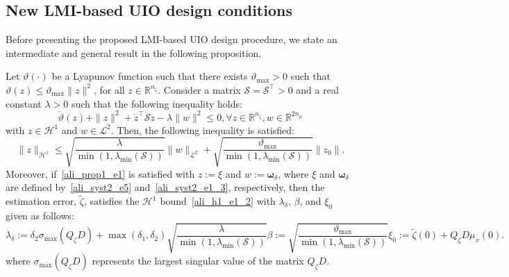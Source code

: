 \subsection{New LMI-based UIO design conditions}
Before presenting the proposed LMI-based UIO design procedure, we state an intermediate and general result in the following proposition.
\begin{proposition}\label{ali_prop1}
Let $\vartheta(\cdot)$ be a Lyapunov function such that there exists $\vartheta_{\max} >0$ such that $\vartheta(z) \leq \vartheta_{\max}\| z \|^{2}$, for all $z \in \mathbb{R}^{n_\zeta}$. Consider a matrix $\mathcal{S} = \mathcal{S}^{\top} > 0$ and a real constant $\lambda >0$ such that the following inequality holds:
\begin{equation}\label{ali_prop1_e1}
\dot{\vartheta}(z) + \| z \|^{2} + \dot{z}^{\top} \mathcal{S} \dot{z} - \lambda \| w \|^{2} \leq 0,
 \forall z \in \mathbb{R}^{n_\zeta}, w \in \mathbb{R}^{2n_{\mu}}
\end{equation}
%
with $z \in \mathcal{H}^{1}$ and $w \in \mathcal{L}^{2}$. Then, the following inequality is satisfied:
\begin{equation}\label{ali_prop1_e2}
\| z \|_{\mathcal{H}^{1}} \leq \sqrt{\frac{\lambda}{\min\left(1,\lambda_{\min}(\mathcal{S})\right)}} \| w \|_{\mathcal{L}^{2}}  
+\sqrt{\frac{\vartheta_{\max}}{\min\left(1,\lambda_{\min}(\mathcal{S})\right)}} \| z_0 \|.
\end{equation}
Moreover, if~\eqref{ali_prop1_e1} is satisfied with $z := \xi$ and $w := \bm{\omega}_{\delta}$, where $\xi$ and $\bm{\omega}_{\delta}$ are defined by~\eqref{ali_syst2_e5} and~\eqref{ali_syst2_e1_3}, respectively, then the estimation error, $\tilde{\zeta}$, satisfies the $\mathcal{H}^{1}$ bound~\eqref{ali_h1_e1_2} with $\lambda_{\delta}$, $\beta$, and $\xi_0$ given as follows:
\begin{subequations}
\begin{equation}\label{ali_prop1_e3}
\lambda_{\delta} := \delta_{2} \sigma_{\max}\left(Q_{\zeta} D\right) 
+ \max\left(\delta_{1}, \delta_{2} \right) \sqrt{\frac{\lambda}{\min\left(1,\lambda_{\min}(\mathcal{S})\right)}}
\end{equation}
\begin{equation}\label{ali_prop1_e4}
\beta := \sqrt{\frac{\vartheta_{\max}}{\min\left(1,\lambda_{\min}(\mathcal{S})\right)}}
\end{equation}
\begin{equation}\label{ali_prop1_e5}
\xi_0 := \tilde{\zeta}(0) + Q_{\zeta} D \mu_{x}(0).
\end{equation}
\end{subequations}
where $\sigma_{\max}\left(Q_{\zeta} D\right)$ represents the largest singular value of the matrix $Q_{\zeta} D$.
\end{proposition}
